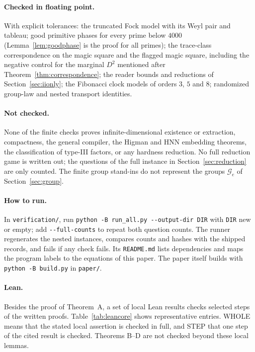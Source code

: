 \paragraph{Checked in floating point.} With explicit tolerances: the truncated Fock model with its Weyl pair and tableau; good primitive phases for every prime below $4000$ (Lemma~\ref{lem:goodphase} is the proof for all primes); the trace-class correspondence on the magic square and the flagged magic square, including the negative control for the marginal $D^2$ mentioned after Theorem~\ref{thm:correspondence}; the reader bounds and reductions of Section~\ref{sec:iionly}; the Fibonacci clock models of orders $3$, $5$ and $8$; randomized group-law and nested transport identities.

\paragraph{Not checked.} None of the finite checks proves infinite-dimensional existence or extraction, compactness, the general compiler, the Higman and HNN embedding theorems, the classification of type-III factors, or any hardness reduction. No full reduction game is written out; the questions of the full instance in Section~\ref{sec:reduction} are only counted. The finite group stand-ins do not represent the groups $\mathcal G_e$ of Section~\ref{sec:group}.

\paragraph{How to run.} In \texttt{verification/}, run \texttt{python -B run\_all.py -{}-output-dir DIR} with \texttt{DIR} new or empty; add \texttt{-{}-full-counts} to repeat both question counts. The runner regenerates the nested instances, compares counts and hashes with the shipped records, and fails if any check fails. Its \texttt{README.md} lists dependencies and maps the program labels to the equations of this paper. The paper itself builds with \texttt{python -B build.py} in \texttt{paper/}.

\paragraph{Lean.} Besides the proof of Theorem~A, a set of local Lean results checks selected steps of the written proofs. Table~\ref{tab:leancore} shows representative entries. WHOLE means that the stated local assertion is checked in full, and STEP that one step of the cited result is checked. Theorems B--D are not checked beyond these local lemmas.

